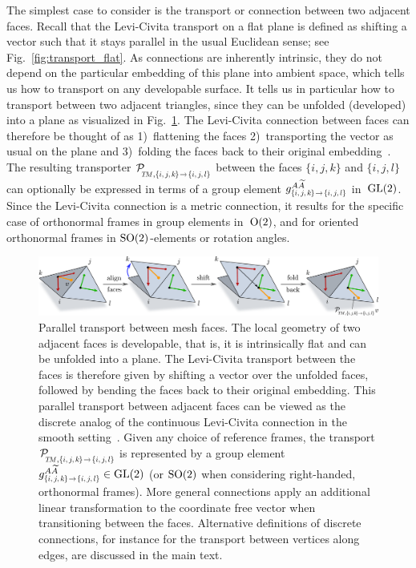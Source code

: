 The simplest case to consider is the transport or connection between two adjacent faces.
Recall that the Levi-Civita transport on a flat plane is defined as shifting a vector such that it stays parallel in the usual Euclidean sense; see Fig.~\ref{fig:transport_flat}.
As connections are inherently intrinsic, they do not depend on the particular embedding of this plane into ambient space, which tells us how to transport on any developable surface.
It tells us in particular how to transport between two adjacent triangles, since they can be unfolded (developed) into a plane as visualized in Fig.~\ref{fig:transport_mesh}.
The Levi-Civita connection between faces can therefore be thought of as
1)~flattening the faces
2)~transporting the vector as usual on the plane and
3)~folding the faces back to their original embedding~\cite{craneTrivialConnectionsDiscrete2010,mitchell1987discrete,craneDiscreteDifferentialGeometry2014}.
The resulting transporter
$\mathcal{P}_{\mkern-2mu\overset{}{\protect\scalebox{.62}{$\!T\!M$},\protect\scalebox{.68}{$\{i,j,k\mkern-1mu\}\!\to\!\{i,j,l\}$}}}$
between the faces $\{i,j,k\}$ and $\{i,j,l\}$ can optionally be expressed in terms of a group element
$g^{A\widetilde{A}}_{\protect\scalebox{.68}{$\{i,j,k\mkern-1mu\}\!\to\!\{i,j,l\}$}}$ in~$\operatorname{GL}(2)$.
Since the Levi-Civita connection is a metric connection, it results for the specific case of orthonormal frames in group elements in~$\operatorname{O}(2)$, and for oriented orthonormal frames in $\operatorname{SO}(2)$-elements or rotation angles.

\begin{figure}
    \centering
    \includegraphics[width=1.\textwidth]{figures/transport_mesh.pdf}
    \caption{\small
        Parallel transport between mesh faces.
        The local geometry of two adjacent faces is developable, that is, it is intrinsically flat and can be unfolded into a plane.
        The Levi-Civita transport between the faces is therefore given by shifting a vector over the unfolded faces, followed by bending the faces back to their original embedding.
        This parallel transport between adjacent faces can be viewed as the discrete analog of the continuous Levi-Civita connection in the smooth setting~\cite{craneTrivialConnectionsDiscrete2010}.
        Given any choice of reference frames, the transport
        $\mathcal{P}_{\mkern-2mu\overset{}{\protect\scalebox{.62}{$\!T\!M$},\protect\scalebox{.68}{$\{i,j,k\mkern-1mu\}\!\to\!\{i,j,l\}$}}}$
        is represented by a group element
        $g^{A\widetilde{A}}_{\protect\scalebox{.68}{$\{i,j,k\mkern-1mu\}\!\to\!\{i,j,l\}$}} \in \GL{2}$ (or $\operatorname{SO}(2)$ when considering right-handed, orthonormal frames).
        More general connections apply an additional linear transformation to the coordinate free vector when transitioning between the faces.
        Alternative definitions of discrete connections, for instance for the transport between vertices along edges, are discussed in the main text.
    }
    \label{fig:transport_mesh}
\end{figure}



